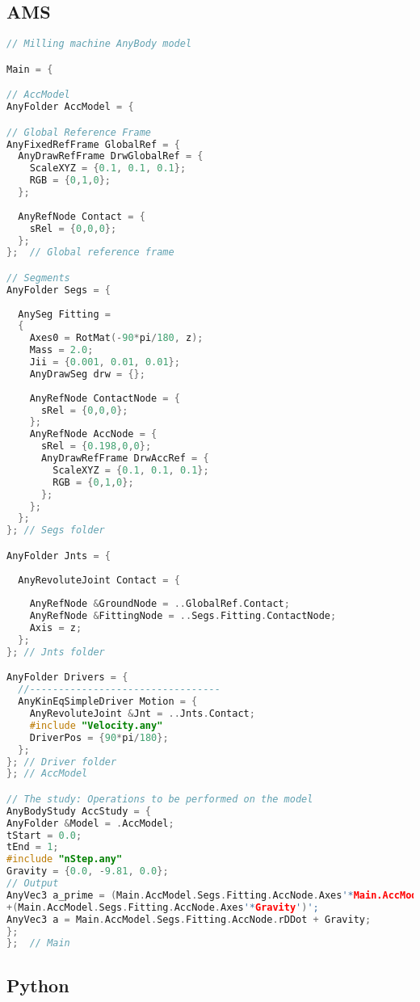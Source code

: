 \subsection{AMS}
\begin{lstlisting}[language=C++]
// Milling machine AnyBody model

Main = {

// AccModel
AnyFolder AccModel = {

// Global Reference Frame
AnyFixedRefFrame GlobalRef = {
  AnyDrawRefFrame DrwGlobalRef = {
    ScaleXYZ = {0.1, 0.1, 0.1};
    RGB = {0,1,0};
  };
  
  AnyRefNode Contact = {
    sRel = {0,0,0};
  };     
};  // Global reference frame

// Segments
AnyFolder Segs = {
  
  AnySeg Fitting = 
  {
    Axes0 = RotMat(-90*pi/180, z);
    Mass = 2.0;
    Jii = {0.001, 0.01, 0.01};
    AnyDrawSeg drw = {};
    
    AnyRefNode ContactNode = {
      sRel = {0,0,0};
    };
    AnyRefNode AccNode = {
      sRel = {0.198,0,0};
      AnyDrawRefFrame DrwAccRef = {
        ScaleXYZ = {0.1, 0.1, 0.1};
        RGB = {0,1,0};
      };      
    };
  }; 
}; // Segs folder

AnyFolder Jnts = {
  
  AnyRevoluteJoint Contact = {
    
    AnyRefNode &GroundNode = ..GlobalRef.Contact;
    AnyRefNode &FittingNode = ..Segs.Fitting.ContactNode;
    Axis = z;    
  };
}; // Jnts folder

AnyFolder Drivers = {
  //---------------------------------
  AnyKinEqSimpleDriver Motion = {
    AnyRevoluteJoint &Jnt = ..Jnts.Contact;
    #include "Velocity.any"
    DriverPos = {90*pi/180};
  }; 
}; // Driver folder
}; // AccModel

// The study: Operations to be performed on the model
AnyBodyStudy AccStudy = {
AnyFolder &Model = .AccModel;
tStart = 0.0;
tEnd = 1;
#include "nStep.any"
Gravity = {0.0, -9.81, 0.0};
// Output
AnyVec3 a_prime = (Main.AccModel.Segs.Fitting.AccNode.Axes'*Main.AccModel.Segs.Fitting.AccNode.rDDot')'
+(Main.AccModel.Segs.Fitting.AccNode.Axes'*Gravity')';
AnyVec3 a = Main.AccModel.Segs.Fitting.AccNode.rDDot + Gravity;
}; 
};  // Main
\end{lstlisting}

\subsection{Python}

